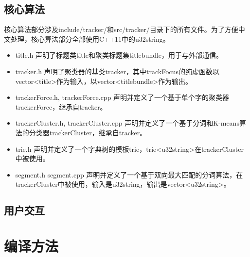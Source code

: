 \documentclass[12pt]{article}
\begin{document}
\subsection{核心算法}
核心算法部分涉及include/tracker/和src/tracker/目录下的所有文件。为了方便中文处理，核心算法部分全部使用C++11中的u32string。
\begin{itemize}
\item title.h 声明了标题类title和聚类标题集titlebundle，用于与外部通信。
\item tracker.h 声明了聚类器的基类tracker，其中trackFocus的纯虚函数以vector<title>作为输入，以vector<titlebundle>作为输出。
\item trackerForce.h, trackerForce.cpp 声明并定义了一个基于单个字的聚类器trackerForce，继承自tracker。
\item trackerCluster.h, trackerCluster.cpp 声明并定义了一个基于分词和K-means算法的分类器trackerCluster，继承自tracker。
\item trie.h 声明并定义了一个字典树的模板trie，trie<u32string>在trackerCluster中被使用。
\item segment.h segment.cpp 声明并定义了一个基于双向最大匹配的分词算法，在trackerCluster中被使用，输入是u32string，输出是vector<u32string>。

\end{itemize}

\subsection{用户交互}


\section{编译方法}

\end{document}
